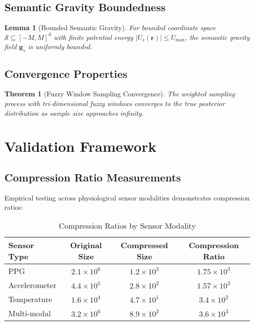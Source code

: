 \documentclass[12pt,a4paper]{article}
\newtheorem{theorem}{Theorem}
\newtheorem{lemma}{Lemma}
\begin{document}
\subsection{Semantic Gravity Boundedness}

\begin{lemma}[Bounded Semantic Gravity]
For bounded coordinate space $\mathcal{S} \subseteq [-M, M]^d$ with finite potential energy $|U_s(\mathbf{r})| \leq U_{\max}$, the semantic gravity field $\mathbf{g}_s$ is uniformly bounded.
\end{lemma}

\subsection{Convergence Properties}

\begin{theorem}[Fuzzy Window Sampling Convergence]
The weighted sampling process with tri-dimensional fuzzy windows converges to the true posterior distribution as sample size approaches infinity.
\end{theorem}

\section{Validation Framework}

\subsection{Compression Ratio Measurements}

Empirical testing across physiological sensor modalities demonstrates compression ratios:

\begin{table}[H]
\centering
\caption{Compression Ratios by Sensor Modality}
\begin{tabular}{lccc}
\toprule
Sensor Type & Original Size & Compressed Size & Compression Ratio \\
\midrule
PPG & $2.1 \times 10^6$ & $1.2 \times 10^3$ & $1.75 \times 10^3$ \\
Accelerometer & $4.4 \times 10^5$ & $2.8 \times 10^2$ & $1.57 \times 10^3$ \\
Temperature & $1.6 \times 10^4$ & $4.7 \times 10^1$ & $3.4 \times 10^2$ \\
Multi-modal & $3.2 \times 10^6$ & $8.9 \times 10^2$ & $3.6 \times 10^3$ \\
\bottomrule
\end{tabular}
\end{table}
\end{document}
